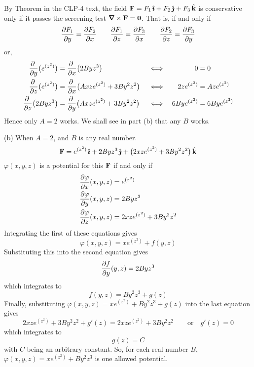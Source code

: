 \begin{solution}
By Theorem  in the CLP-4 text,
the field $\mathbf{F}= F_1\,\hat{\pmb{\imath}} + F_2\,\hat{\pmb{\jmath}} + F_3\,\hat{\mathbf{k}}$ is conservative 
only if it passes the screening test
$\vnabla\times\vF=\vZero$. That is, if and only if
\begin{align*}
\pdiff{F_1}{y}=\pdiff{F_2}{x}\qquad
\pdiff{F_1}{z}=\pdiff{F_3}{x}\qquad
\pdiff{F_2}{z}=\pdiff{F_3}{y}
\end{align*}
or,
\begin{align*}
\pdiff{}{y}\big(e^{(z^2)}\big)
&=\pdiff{}{x}\big(2Byz^3\big) &
&\iff &
0 & =0
\\
%
\pdiff{}{z}\big(e^{(z^2)}\big)
&=\pdiff{}{x}\big(Axze^{(z^2)}+3By^2z^2\big) &
&\iff &
2ze^{(z^2)} & =Aze^{(z^2)}
\\
%
\pdiff{}{z}\big(2Byz^3\big)
&=\pdiff{}{y}\big(Axze^{(z^2)}+3By^2z^2\big) &
&\iff &
6Bye^{(z^2)}& =6Bye^{(z^2)}
\end{align*}
Hence only $A=2$ works. We shall see in part (b) that any $B$ works.

(b) When $A=2$, and $B$ is any real number.
\begin{equation*}
\mathbf{F}=e^{(z^2)}\,\hat{\pmb{\imath}}+2Byz^3\,\hat{\pmb{\jmath}}
          +\big(2xze^{(z^2)}+3By^2z^2\big)\,\hat{\mathbf{k}}
\end{equation*}
$\varphi(x,y,z)$ is a potential for this $\mathbf{F}$ if and only if
\begin{align*}
\pdiff{\varphi}{x}(x,y,z) &= e^{(z^2)} \\
\pdiff{\varphi}{y}(x,y,z) &= 2Byz^3 \\
\pdiff{\varphi}{z}(x,y,z) &= 2xze^{(z^2)}+3By^2z^2
\end{align*}
Integrating the first of these equations gives
\begin{equation*}
\varphi(x,y,z) = xe^{(z^2)} + f(y,z)
\end{equation*}
Substituting this into the second equation gives 
\begin{equation*}
\pdiff{f}{y}(y,z) 
   = 2Byz^3
\end{equation*}
which integrates to
\begin{equation*}
f(y,z) = By^2 z^3 + g(z)
\end{equation*}
Finally, substituting $\varphi(x,y,z) = xe^{(z^2)}+By^2 z^3 + g(z)$
into the last equation gives
\begin{equation*}
2xze^{(z^2)} + 3By^2z^2 + g'(z) 
   = 2xze^{(z^2)}+3By^2z^2\qquad\text{or}\quad
g'(z) = 0
\end{equation*}
which integrates to
\begin{equation*}
g(z) = C
\end{equation*}
with $C$ being an arbitrary constant.
So, for each  real number $B$,
$\varphi(x,y,z)=xe^{(z^2)}+By^2 z^3$ is one allowed potential.
\end{solution}





